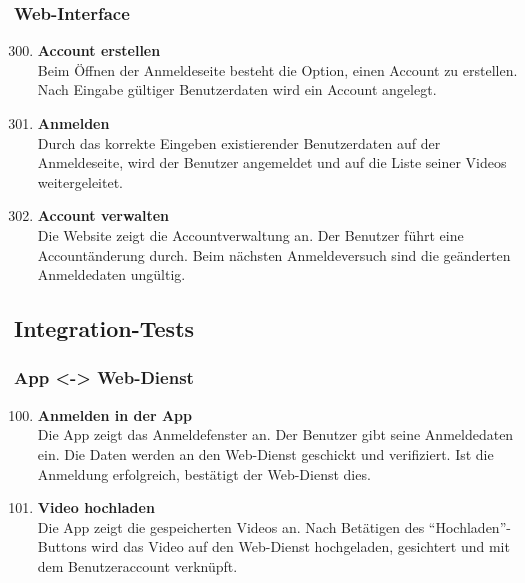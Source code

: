 \subsubsection{\gls{Web-Interface}}
\begin{enumerate}[\bfseries{TK}10]  
\setcounter{enumi}{299}{}
\item \textbf{Account erstellen} \hfill\\
Beim \"Offnen der Anmeldeseite besteht die Option, einen Account zu erstellen. Nach Eingabe g\"ultiger Benutzerdaten wird ein Account angelegt.

\item \textbf{Anmelden} \hfill\\
Durch das korrekte Eingeben existierender Benutzerdaten auf der Anmeldeseite, wird der Benutzer angemeldet und auf die Liste seiner Videos weitergeleitet.

\item \textbf{Account verwalten} \hfill\\
Die Website zeigt die Accountverwaltung an. Der Benutzer f\"uhrt eine Account\"anderung durch. Beim n\"achsten Anmeldeversuch sind die ge\"anderten Anmeldedaten ung\"ultig.

\end{enumerate}


\subsection{Integration-Tests}
\subsubsection{\gls{App} <-> \gls{Web-Dienst}}
\begin{enumerate}[\bfseries{TI}10]  
\setcounter{enumi}{99}{}

\item \textbf{Anmelden in der \gls{App}} \hfill\\
Die \gls{App} zeigt das Anmeldefenster an. Der Benutzer gibt seine Anmeldedaten ein. Die Daten werden an den \gls{Web-Dienst} geschickt und verifiziert. Ist die Anmeldung erfolgreich, bestätigt der Web-Dienst dies.

\item \textbf{Video hochladen} \hfill\\
Die \gls{App} zeigt die gespeicherten Videos an. Nach Bet\"atigen des ``Hochladen''-Buttons wird das Video auf den \gls{Web-Dienst} hochgeladen, gesichtert und mit dem Benutzeraccount verkn\"upft.
\end{enumerate}

